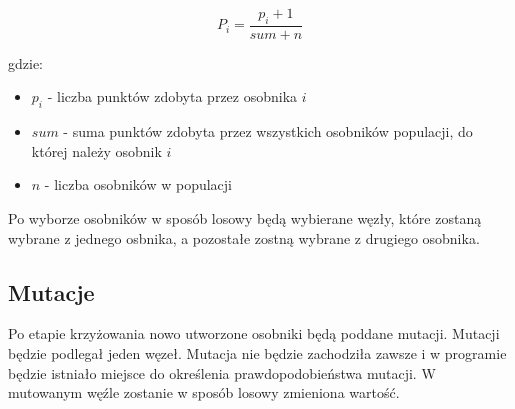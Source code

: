 \documentclass[paper=a4, fontsize=11pt]{scrartcl} %
\numberwithin{equation}{section} %
\numberwithin{figure}{section} %
\numberwithin{table}{section} %
\begin{document}
\begin{equation}
P_i=\frac{p_i + 1}{sum+n}
\end{equation}

gdzie:

\begin{itemize}
	\item ${p_i}$ - liczba punktów zdobyta przez osobnika $i$
	\item $sum$ - suma punktów zdobyta przez wszystkich osobników populacji, do której należy osobnik $i$
	\item $n$ - liczba osobników w populacji
\end{itemize}

Po wyborze osobników w sposób losowy będą wybierane węzły, które zostaną wybrane z jednego osbnika, a pozostałe zostną wybrane z drugiego osobnika.

\subsection{Mutacje}
Po etapie krzyżowania nowo utworzone osobniki będą poddane mutacji. Mutacji będzie podlegał jeden węzeł. Mutacja nie będzie zachodziła zawsze i w programie będzie istniało miejsce do określenia prawdopodobieństwa mutacji. W mutowanym węźle zostanie w sposób losowy zmieniona wartość.

\clearpage

%



\nocite{*}


\end{document}
